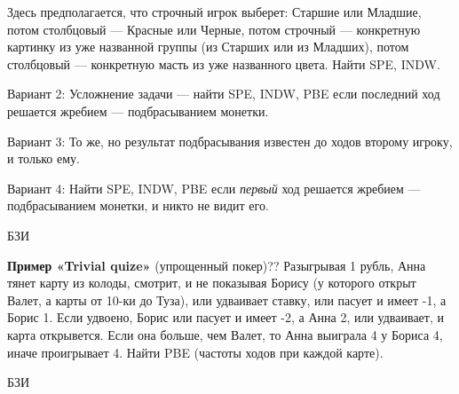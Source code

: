 \begin{problem}
Здесь предполагается, что строчный игрок выберет: Старшие
или Младшие, потом столбцовый — Красные или Черные, потом
строчный — конкретную картинку из уже названной группы (из
Старших или из Младших), потом столбцовый — конкретную
масть из уже названного цвета. Найти SPE, INDW.

Вариант 2: Усложнение задачи — найти SPE, INDW, PBE если
последний ход решается жребием — подбрасыванием монетки.

Вариант 3: То же, но результат подбрасывания известен до
ходов второму игроку, и только ему.

Вариант 4: Найти SPE, INDW, PBE если {\em первый} ход
решается жребием — подбрасыванием монетки, и никто не видит
его.



\begin{source}
БЗИ
\end{source}


\begin{sol}

\end{sol}
\end{problem}




\begin{problem}
 {\bf Пример «Trivial quize»} (упрощенный покер)?? Разыгрывая 1
рубль, Анна тянет карту из колоды, смотрит, и не показывая
Борису (у которого открыт Валет, а карты от 10-ки до Туза), или
удваивает ставку, или пасует и имеет -1, а Борис 1. Если
удвоено, Борис или пасует и имеет -2, а Анна 2, или удваивает, и
карта открывется. Если она больше, чем Валет, то Анна выиграла 4
у Бориса 4, иначе проигрывает 4. Найти PBE (частоты ходов при
каждой карте).



\begin{source}
БЗИ
\end{source}


\begin{sol}

\end{sol}
\end{problem}




